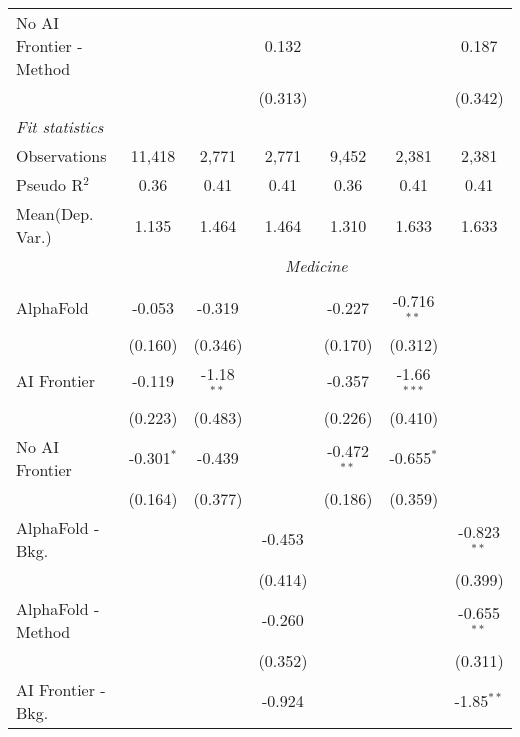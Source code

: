 \begin{tabular}{lcccccc}
   No AI Frontier - Method &               &              & 0.132        &               &              & 0.187\\   
                           &               &              & (0.313)      &               &              & (0.342)\\   
   \midrule
   \emph{Fit statistics}\\
   Observations            & 11,418        & 2,771        & 2,771        & 9,452         & 2,381        & 2,381\\  
   Pseudo R$^2$            & 0.36          & 0.41         & 0.41         & 0.36          & 0.41         & 0.41\\  
   
Mean(Dep. Var.) & 1.135 & 1.464 & 1.464 & 1.310 & 1.633 & 1.633 \\
 & \multicolumn{6}{c}{\textit{Medicine}} \\ \\
   AlphaFold               & -0.053       & -0.319       &              & -0.227        & -0.716$^{**}$ &   \\   
                           & (0.160)      & (0.346)      &              & (0.170)       & (0.312)       &   \\   
   AI Frontier             & -0.119       & -1.18$^{**}$ &              & -0.357        & -1.66$^{***}$ &   \\   
                           & (0.223)      & (0.483)      &              & (0.226)       & (0.410)       &   \\   
   No AI Frontier          & -0.301$^{*}$ & -0.439       &              & -0.472$^{**}$ & -0.655$^{*}$  &   \\   
                           & (0.164)      & (0.377)      &              & (0.186)       & (0.359)       &   \\   
   AlphaFold - Bkg.        &              &              & -0.453       &               &               & -0.823$^{**}$\\   
                           &              &              & (0.414)      &               &               & (0.399)\\   
   AlphaFold - Method      &              &              & -0.260       &               &               & -0.655$^{**}$\\   
                           &              &              & (0.352)      &               &               & (0.311)\\   
   AI Frontier - Bkg.      &              &              & -0.924       &               &               & -1.85$^{**}$\\   

\end{tabular}
